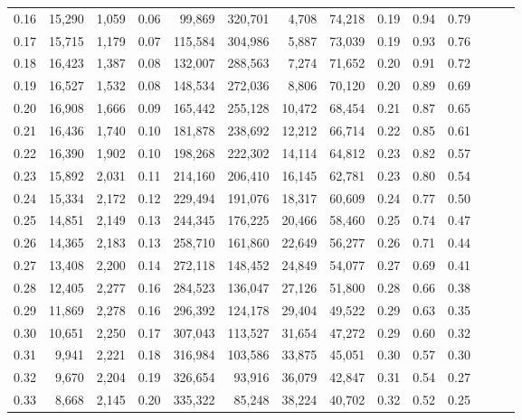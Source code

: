 \begin{tabular}{rrrrrrrrrrrrrr}
0.16 &  15,290 &  1,059 &  0.06 &   99,869 &  320,701 &   4,708 &  74,218 &  0.19 &  0.94 &      0.79 \\
0.17 &  15,715 &  1,179 &  0.07 &  115,584 &  304,986 &   5,887 &  73,039 &  0.19 &  0.93 &      0.76 \\
0.18 &  16,423 &  1,387 &  0.08 &  132,007 &  288,563 &   7,274 &  71,652 &  0.20 &  0.91 &      0.72 \\
0.19 &  16,527 &  1,532 &  0.08 &  148,534 &  272,036 &   8,806 &  70,120 &  0.20 &  0.89 &      0.69 \\
0.20 &  16,908 &  1,666 &  0.09 &  165,442 &  255,128 &  10,472 &  68,454 &  0.21 &  0.87 &      0.65 \\
0.21 &  16,436 &  1,740 &  0.10 &  181,878 &  238,692 &  12,212 &  66,714 &  0.22 &  0.85 &      0.61 \\
0.22 &  16,390 &  1,902 &  0.10 &  198,268 &  222,302 &  14,114 &  64,812 &  0.23 &  0.82 &      0.57 \\
0.23 &  15,892 &  2,031 &  0.11 &  214,160 &  206,410 &  16,145 &  62,781 &  0.23 &  0.80 &      0.54 \\
0.24 &  15,334 &  2,172 &  0.12 &  229,494 &  191,076 &  18,317 &  60,609 &  0.24 &  0.77 &      0.50 \\
0.25 &  14,851 &  2,149 &  0.13 &  244,345 &  176,225 &  20,466 &  58,460 &  0.25 &  0.74 &      0.47 \\
0.26 &  14,365 &  2,183 &  0.13 &  258,710 &  161,860 &  22,649 &  56,277 &  0.26 &  0.71 &      0.44 \\
0.27 &  13,408 &  2,200 &  0.14 &  272,118 &  148,452 &  24,849 &  54,077 &  0.27 &  0.69 &      0.41 \\
0.28 &  12,405 &  2,277 &  0.16 &  284,523 &  136,047 &  27,126 &  51,800 &  0.28 &  0.66 &      0.38 \\
0.29 &  11,869 &  2,278 &  0.16 &  296,392 &  124,178 &  29,404 &  49,522 &  0.29 &  0.63 &      0.35 \\
0.30 &  10,651 &  2,250 &  0.17 &  307,043 &  113,527 &  31,654 &  47,272 &  0.29 &  0.60 &      0.32 \\
0.31 &   9,941 &  2,221 &  0.18 &  316,984 &  103,586 &  33,875 &  45,051 &  0.30 &  0.57 &      0.30 \\
0.32 &   9,670 &  2,204 &  0.19 &  326,654 &   93,916 &  36,079 &  42,847 &  0.31 &  0.54 &      0.27 \\
0.33 &   8,668 &  2,145 &  0.20 &  335,322 &   85,248 &  38,224 &  40,702 &  0.32 &  0.52 &      0.25 \\

\end{tabular}
